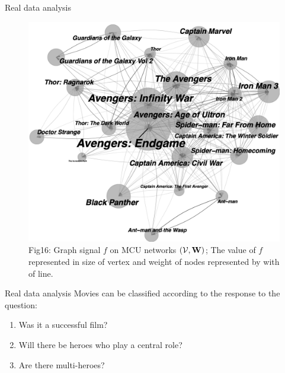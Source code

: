 \documentclass[
  ignorenonframetext,
]{beamer}
\providecommand{\tightlist}{%
  \setlength{\itemsep}{0pt}\setlength{\parskip}{0pt}}\usepackage{longtable,booktabs,array}
\begin{document}
\begin{frame}{Real data analysis}
\label{real-data-analysis-2}
\begin{figure}[H]

{\centering \includegraphics{Beamer_files/figure-beamer/731cd6ca-1909-4d11-abaf-7c54dc27a171-1-960ea596-34b9-4342-9092-3f9ceb658db7.png}

}

\caption{Fig16: Graph signal \(f\) on MCU networks
\(({\cal V},{\bf W})\); The value of \(f\) represented in size of vertex
and weight of nodes represented by with of line.}

\end{figure}%
\end{frame}

\begin{frame}{Real data analysis}
\label{real-data-analysis-3}
Movies can be classified according to the response to the question:

\begin{enumerate}
\tightlist
\item
  Was it a successful film?
\item
  Will there be heroes who play a central role?
\item
  Are there multi-heroes?
\end{enumerate}
\end{frame}
\end{document}
